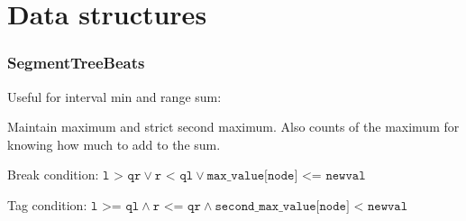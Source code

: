\chapter{Data structures}

\subsection{SegmentTreeBeats}
Useful for interval min and range sum: 

Maintain maximum and strict second maximum. Also counts of the maximum for knowing how much to add to the sum.

Break condition: $\texttt{l > qr} \lor \texttt{r < ql} \lor \texttt{max_value[node] <= newval}$

Tag condition: $\texttt{l >= ql} \land \texttt{r <= qr} \land \texttt{second_max_value[node] < newval}$

